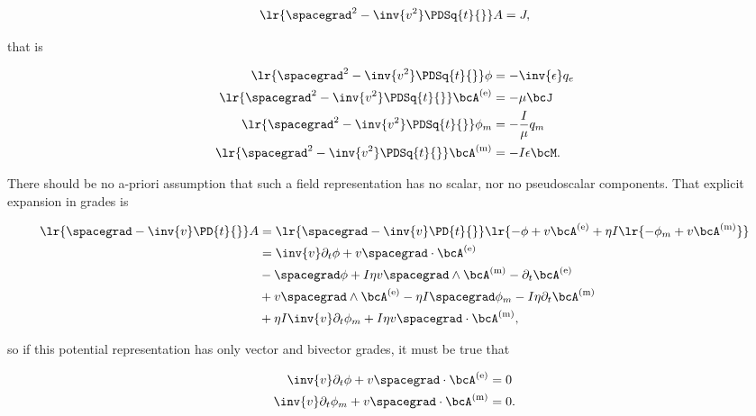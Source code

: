 \begin{dmath}\label{eqn:potentialMethods:1620}
\lr{ \spacegrad^2 - \inv{v^2} \PDSq{t}{} } A = J,
\end{dmath}

that is

\begin{dmath}\label{eqn:potentialMethods:1600}
\begin{aligned}
\lr{ \spacegrad^2 - \inv{v^2} \PDSq{t}{} } \phi &= - \inv{\epsilon} q_e \\
\lr{ \spacegrad^2 - \inv{v^2} \PDSq{t}{} } \bcA^\e &= - \mu \bcJ \\
\lr{ \spacegrad^2 - \inv{v^2} \PDSq{t}{} } \phi_m &= - \frac{I}{\mu} q_m \\
\lr{ \spacegrad^2 - \inv{v^2} \PDSq{t}{} } \bcA^\m &= - I \epsilon \bcM.
\end{aligned}
\end{dmath}

There should be no a-priori assumption that such a field representation has no scalar, nor no pseudoscalar components.  That explicit expansion in grades is

\begin{dmath}\label{eqn:potentialMethods:1640}
\begin{aligned}
\lr{ \spacegrad - \inv{v} \PD{t}{} } A
&=
\lr{ \spacegrad - \inv{v} \PD{t}{} } \lr{ -\phi + v \bcA^\e + \eta I \lr{ -\phi_m + v \bcA^\m } } \\
&=
\inv{v} \partial_t \phi
+ v \spacegrad \cdot \bcA^\e  \\
&-\spacegrad \phi
+ I \eta v \spacegrad \wedge \bcA^\m
- \partial_t \bcA^\e  \\
&+ v \spacegrad \wedge \bcA^\e
- \eta I \spacegrad \phi_m
- I \eta \partial_t \bcA^\m \\
&+ \eta I \inv{v} \partial_t \phi_m
+ I \eta v \spacegrad \cdot \bcA^\m,
\end{aligned}
\end{dmath}

so if this potential representation has only vector and bivector grades, it must be true that

\begin{dmath}\label{eqn:potentialMethods:1660}
\begin{aligned}
\inv{v} \partial_t \phi + v \spacegrad \cdot \bcA^\e &= 0 \\
\inv{v} \partial_t \phi_m + v \spacegrad \cdot \bcA^\m &= 0.
\end{aligned}
\end{dmath}

